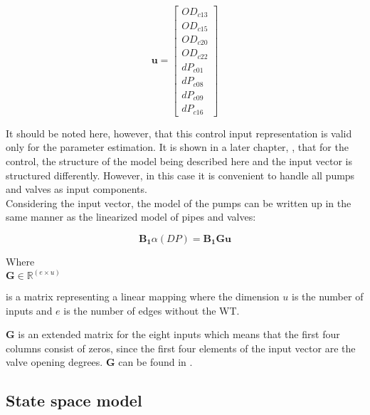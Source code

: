 \begin{equation}
\pmb{u} =
\begin{bmatrix} 
OD_{c13} \\
OD_{c15} \\
OD_{c20} \\
OD_{c22} \\
dP_{c01} \\
dP_{c08} \\
dP_{c09} \\
dP_{c16} 
\label{inputvector}
\end{bmatrix} 
\end{equation}

It should be noted here, however, that this control input representation is valid only for the parameter estimation. It is shown in a later chapter, , that for the control, the structure of the model being described here and the input vector is structured differently. However, in this case it is convenient to handle all pumps and valves as input components. 
\\
Considering the input vector, the model of the pumps can be written up in the same manner as the linearized model of pipes and valves: 

\begin{equation}
\pmb{B_1} \alpha(DP) = \pmb{B_1} \pmb{G} \pmb{u}
\label{gamma_lin}
\end{equation}

\begin{minipage}[t]{0.20\textwidth}
Where\\
\hspace*{8mm} $\pmb{G} \in \pmb{\mathbb{R}}^{(e \times u)} $ 
\end{minipage}
\begin{minipage}[t]{0.68\textwidth}
\vspace*{2mm}
is a matrix representing a linear mapping where the dimension $u$ is the number of inputs and $e$ is the number of edges without the WT. 
\end{minipage} 

$\pmb{G}$ is an extended matrix for the eight inputs which means that the first four columns consist of zeros, since the first four elements of the input vector are the valve opening degrees. $\pmb{G}$ can be found in .

\subsection{State space model}
 \label{SystemLin}

